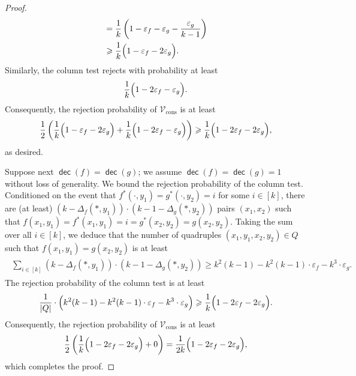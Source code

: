 \documentclass[11pt,fleqn]{article}
\renewcommand{\geq}{\geqslant}
\renewcommand{\epsilon}{\varepsilon}
\DeclareMathOperator{\dec}{\mathsf{dec}}
\newcommand{\V}{\calV}
\newcommand{\f}{f}
\newcommand{\g}{g}
\newcommand{\Vcons}{\V_\mathrm{cons}}
\newcommand{\calV}{\mathcal{V}}
\theoremstyle{definition}
\numberwithin{equation}{section}
\begin{document}
\begin{proof}
\begin{align}
\begin{aligned}
    & = \frac{1}{k} \left(1-\epsilon_{\f}-\epsilon_{\g}-\frac{\epsilon_{\g}}{k-1}\right) \\
    & \geq \frac{1}{k} \Bigl(1-\epsilon_{\f} -2 \epsilon_{\g}\Bigr).
\end{aligned}
\end{align}
Similarly, the column test rejects with probability at least
\begin{align}
    \frac{1}{k} \Bigl( 1-2\epsilon_{\f}-\epsilon_{\g} \Bigr).
\end{align}
Consequently, the rejection probability of $\Vcons$ is at least
\begin{align}
    \frac{1}{2} \left(\frac{1}{k} \Bigl( 1-\epsilon_{\f} -2 \epsilon_{\g}\Bigr)
        + \frac{1}{k} \Bigl(1-2\epsilon_{\f}-\epsilon_{\g} \Bigr)\right) 
    \geq \frac{1}{k} \Bigl( 1-2\epsilon_{\f}-2\epsilon_{\g} \Bigr),
\end{align}
as desired.


Suppose next $\dec(\f) = \dec(\g)$;
we assume $\dec(\f)=\dec(\g)=1$ without loss of generality.
We bound the rejection probability of the column test.
Conditioned on the event that
$\f^*(\cdot,y_1) = \g^*(\cdot,y_2) = i$ for some $i \in [k]$,
there are (at least) $(k-\Delta_{\f}(*,y_1))\cdot(k-1-\Delta_{\g}(*,y_2))$ pairs $(x_1,x_2)$ such that
$\f(x_1,y_1) = \f^*(x_1,y_1) = i = \g^*(x_2,y_2) = \g(x_2,y_2)$.
Taking the sum over all $i \in [k]$, we deduce that the number of quadruples $(x_1,y_1,x_2,y_2) \in Q$ such
that $\f(x_1,y_1) = \g(x_2,y_2)$ is at least
\begin{align}
\begin{aligned}
    \sum_{i \in [k]} (k-\Delta_{\f}(*,y_1))\cdot(k-1-\Delta_{\g}(*,y_2)) \geq k^2(k-1) - k^2(k-1) \cdot \epsilon_{\f} - k^3 \cdot \epsilon_{\g}.
\end{aligned}
\end{align}
The rejection probability of the column test is at least 
\begin{align}
    \frac{1}{|Q|} \cdot \Bigl(
        k^2(k-1) - k^2(k-1) \cdot \epsilon_{\f} - k^3 \cdot \epsilon_{\g}
    \Bigr) \geq \frac{1}{k} \Bigl(1-2\epsilon_{\f} -2\epsilon_{\g} \Bigr).
\end{align}
Consequently, the rejection probability of $\Vcons$ is at least
\begin{align}
    \frac{1}{2}\left(
        \frac{1}{k} \Bigl(1-2\epsilon_{\f} -2\epsilon_{\g}\Bigr) + 0
    \right)
    = \frac{1}{2k} \Bigl(1-2\epsilon_{\f} -2\epsilon_{\g}\Bigr),
\end{align}
which completes the proof.
\end{proof}
\end{document}
